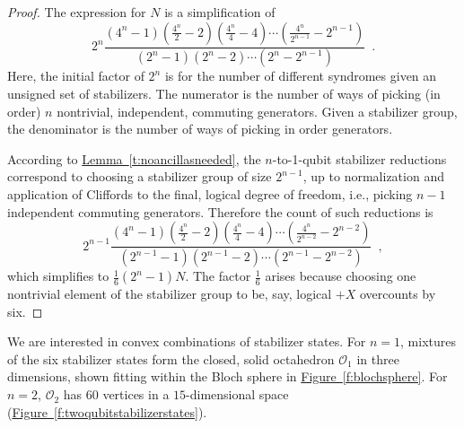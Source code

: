 \documentclass[11pt]{article}
\newcommand{\beq}{\begin{equation}}
\newcommand{\eeq}{\end{equation}}
\theoremstyle{note}
\newcommand{\lemref}[1]{\hyperref[#1]{{Lemma~\ref*{#1}}}}
\newcommand{\figref}[1]{\hyperref[#1]{{Figure~\ref*{#1}}}}
\begin{document}
\begin{proof}
The expression for $N$ is a simplification of 
\beq
2^n \frac{(4^n-1)(\tfrac{4^n}{2}-2)(\tfrac{4^n}{4}-4)\cdots(\tfrac{4^n}{2^{n-1}}-2^{n-1})}
{(2^n-1)(2^n-2)\cdots(2^n-2^{n-1})}
 \enspace .
\eeq
Here, the initial factor of $2^n$ is for the number of different syndromes given an unsigned set of stabilizers.  The numerator is the number of ways of picking (in order) $n$ nontrivial, independent, commuting generators.  Given a stabilizer group, the denominator is the number of ways of picking in order generators.

According to \lemref{t:noancillasneeded}, the $n$-to-1-qubit stabilizer reductions correspond to choosing a stabilizer group of size $2^{n-1}$, up to normalization and application of Cliffords to the final, logical degree of freedom, i.e., picking $n-1$ independent commuting generators.  Therefore the count of such reductions is
\beq
2^{n-1} \frac{(4^n-1)(\tfrac{4^n}{2}-2)(\tfrac{4^n}{4}-4)\cdots(\tfrac{4^n}{2^{n-2}}-2^{n-2})}
{(2^{n-1}-1)(2^{n-1}-2)\cdots(2^{n-1}-2^{n-2})}
 \enspace ,
\eeq
which simplifies to $\tfrac{1}{6}(2^n-1)N$.  The factor $\frac 1 6$ arises because choosing one nontrivial element of the stabilizer group to be, say, logical $+X$ overcounts by six.
\end{proof}

We are interested in convex combinations of stabilizer states.  For $n=1$, mixtures of the six stabilizer states form the closed, solid octahedron $\mathcal O_1$ in three dimensions, shown fitting within the Bloch sphere in \figref{f:blochsphere}.  For $n=2$, $\mathcal O_2$ has $60$ vertices in a $15$-dimensional space (\figref{f:twoqubitstabilizerstates}).  
\end{document}
